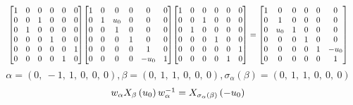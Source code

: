 \documentclass[11pt]{article}
\theoremstyle{definition}
\begin{document}
\[
\scaletoalign{\textwidth}{{\left[\begin{matrix}1 & 0 & 0 & 0 & 0 & 0\\0 & 0 & 1 & 0 & 0 & 0\\0 & 1 & 0 & 0 & 0 & 0\\0 & 0 & 0 & 1 & 0 & 0\\0 & 0 & 0 & 0 & 0 & 1\\0 & 0 & 0 & 0 & 1 & 0\end{matrix}\right]} {\left[\begin{matrix}1 & 0 & 0 & 0 & 0 & 0\\0 & 1 & u_{0} & 0 & 0 & 0\\0 & 0 & 1 & 0 & 0 & 0\\0 & 0 & 0 & 1 & 0 & 0\\0 & 0 & 0 & 0 & 1 & 0\\0 & 0 & 0 & 0 & - u_{0} & 1\end{matrix}\right]} {\left[\begin{matrix}1 & 0 & 0 & 0 & 0 & 0\\0 & 0 & 1 & 0 & 0 & 0\\0 & 1 & 0 & 0 & 0 & 0\\0 & 0 & 0 & 1 & 0 & 0\\0 & 0 & 0 & 0 & 0 & 1\\0 & 0 & 0 & 0 & 1 & 0\end{matrix}\right]} = {\left[\begin{matrix}1 & 0 & 0 & 0 & 0 & 0\\0 & 1 & 0 & 0 & 0 & 0\\0 & u_{0} & 1 & 0 & 0 & 0\\0 & 0 & 0 & 1 & 0 & 0\\0 & 0 & 0 & 0 & 1 & - u_{0}\\0 & 0 & 0 & 0 & 0 & 1\end{matrix}\right]}}
\]
\[
\alpha = \left( 0, \  -1, \  1, \  0, \  0, \  0\right), \beta = \left( 0, \  1, \  1, \  0, \  0, \  0\right), \sigma_{\alpha}(\beta) = \left( 0, \  1, \  1, \  0, \  0, \  0\right)
\]
\[
\scaletoalign{\textwidth}{w_{\alpha} X_{\beta}\left(u_{0}\right) w_{\alpha}^{-1} = X_{\sigma_{\alpha}\left(\beta\right)}\left(- u_{0}\right)}
\]
\end{document}
